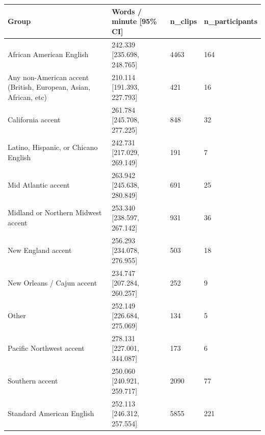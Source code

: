 \begin{tabular}{llll}
\toprule
Group & Words / minute [95\% CI] & n\_clips & n\_participants \\
\midrule
African American English & 242.339 [235.698, 248.765] & 4463 & 164 \\
Any non-American accent (British, European, Asian, African, etc) & 210.114 [191.393, 227.793] & 421 & 16 \\
California accent & 261.784 [245.708, 277.225] & 848 & 32 \\
Latino, Hispanic, or Chicano English & 242.731 [217.029, 269.149] & 191 & 7 \\
Mid Atlantic accent & 263.942 [245.638, 280.849] & 691 & 25 \\
Midland or Northern Midwest accent & 253.340 [238.597, 267.142] & 931 & 36 \\
New England accent & 256.293 [234.078, 276.955] & 503 & 18 \\
New Orleans / Cajun accent & 234.747 [207.284, 260.257] & 252 & 9 \\
Other & 252.149 [226.684, 275.069] & 134 & 5 \\
Pacific Northwest accent & 278.131 [227.001, 344.087] & 173 & 6 \\
Southern accent & 250.060 [240.921, 259.717] & 2090 & 77 \\
Standard American English & 252.113 [246.312, 257.554] & 5855 & 221 \\
\bottomrule
\end{tabular}

